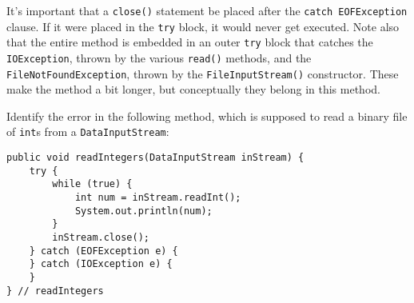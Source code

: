 It's important that a {\tt close()} statement be placed after the
{\tt catch EOF\-Exception} clause.  If it were placed in the {\tt try} block,
it would never get executed.   Note also that the entire method is
embedded in an outer {\tt try} block that catches the
{\tt IOException}, thrown by the various {\tt read()} methods, and the
{\tt FileNotFoundException}, thrown by the {\tt FileInputStream()}
constructor.  These make the method a bit longer, but conceptually
they belong in this method.



\pagebreak
{}
\begin{SSTUDY}

\item  Identify the error in the following method, which is supposed to read
a binary file of {\tt int}s from a {\tt DataInputStream}:

\begin{jjjlisting}
\begin{lstlisting}
public void readIntegers(DataInputStream inStream) {
    try {
        while (true) {
            int num = inStream.readInt();
            System.out.println(num);
        }
        inStream.close();
    } catch (EOFException e) {
    } catch (IOException e) {
    }
} // readIntegers
\end{lstlisting}
\end{jjjlisting}
\end{SSTUDY}


